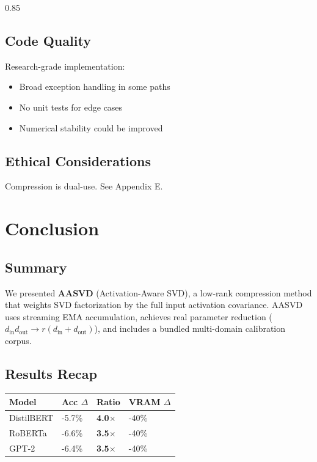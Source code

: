 0.85

\subsection{Code Quality}

Research-grade implementation:
\begin{itemize}
\item Broad exception handling in some paths
\item No unit tests for edge cases
\item Numerical stability could be improved

\end{itemize}
\subsection{Ethical Considerations}

Compression is dual-use. See Appendix E.


\section{Conclusion}

\subsection{Summary}

We presented \textbf{AASVD} (Activation-Aware SVD), a low-rank compression method 
that weights SVD factorization by the full input activation covariance. AASVD 
uses streaming EMA accumulation, achieves real parameter reduction 
($d_\text{in} d_\text{out} \to r(d_\text{in} + d_\text{out})$), and includes 
a bundled multi-domain calibration corpus.

\subsection{Results Recap}

\begin{table}[H]
\centering
\small
\begin{tabular}{llll}
\toprule
\textbf{Model} & \textbf{Acc $\Delta$} & \textbf{Ratio} & \textbf{VRAM $\Delta$} \\
\midrule
DistilBERT & -5.7\% & \textbf{4.0$\times$} & -40\% \\
RoBERTa & -6.6\% & \textbf{3.5$\times$} & -40\% \\
GPT-2 & -6.4\% & \textbf{3.5$\times$} & -40\% \\
\bottomrule
\end{tabular}
\end{table}

